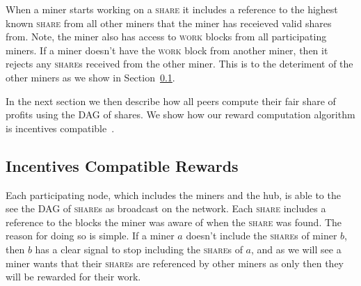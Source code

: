 \documentclass{article}
\begin{document}
When a miner starts working on a \textsc{share} it includes a
reference to the highest known \textsc{share} from all other miners
that the miner has receieved valid shares from. Note, the miner also
has access to \textsc{work} blocks from all participating miners. If a
miner doesn't have the \textsc{work} block from another miner, then it
rejects any \textsc{share}s received from the other miner. This is to
the deteriment of the other miners as we show in
Section~\ref{sec:rewards}.

In the next section we then describe how all peers compute their fair
share of profits using the DAG of shares. We show how our reward
computation algorithm is incentives
compatible~\cite{incentives-compatible}.

  
  
\subsection{Incentives Compatible Rewards}\label{sec:rewards}

Each participating node, which includes the miners and the hub, is
able to the see the DAG of \textsc{share}s as broadcast on the
network. Each \textsc{share} includes a reference to the blocks the
miner was aware of when the \textsc{share} was found. The reason for
doing so is simple. If a miner $a$ doesn't include the \textsc{share}s
of miner $b$, then $b$ has a clear signal to stop including the
\textsc{share}s of $a$, and as we will see a miner wants that their
\textsc{share}s are referenced by other miners as only then they will
be rewarded for their work.
\end{document}
